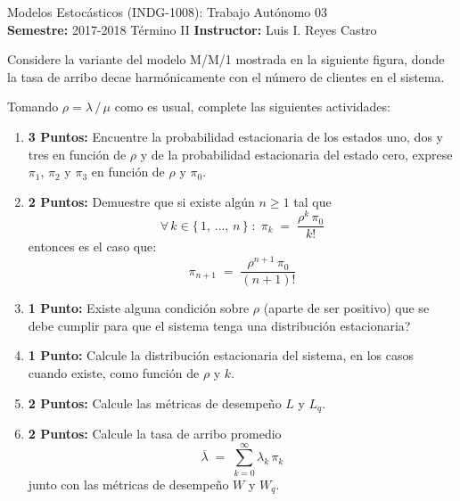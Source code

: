 \documentclass[ a4paper, twoside, 11pt]{article}
\newcommand{\numero}{03}
\begin{document}
\allowdisplaybreaks



\begin{center}
\Large Modelos Estoc\'asticos (INDG-1008): Trabajo Aut\'onomo \numero \\[1ex]
\small \textbf{Semestre:} 2017-2018 T\'ermino II \qquad
\textbf{Instructor:} Luis I. Reyes Castro
\end{center}
\fullskip

%
\halfskip

\begin{problem}
Considere la variante del modelo M/M/1 mostrada en la siguiente figura, donde la tasa de arribo decae harm\'onicamente con el n\'umero de clientes en el sistema. 

\begin{figure}[htb]
\centering
\def\svgwidth{0.9\columnwidth}

\end{figure}
\halfskip

Tomando $\rho = \lambda \, / \, \mu$ como es usual, complete las siguientes actividades: 
\begin{enumerate}[label=\textbf{\alph*)}]
\item \textbf{3 Puntos:} Encuentre la probabilidad estacionaria de los estados uno, dos y tres en funci\'on de $\rho$ y de la probabilidad estacionaria del estado cero, \ie exprese $\pi_1$, $\pi_2$ y $\pi_3$ en funci\'on de $\rho$ y $\pi_0$. 
\item \textbf{2 Puntos:} Demuestre que si existe alg\'un $n \geq 1$ tal que
\[
\forall \, k \in \{ \, 1, \, \dots, \, n \, \} \; \colon \;
\pi_k \; = \; \frac{ \rho^k \, \pi_0 }{k!}
\]
entonces es el caso que: 
\[
\pi_{n+1} \; = \; \frac{ \rho^{n+1} \, \pi_0 }{(n+1)!}
\]
\item \textbf{1 Punto:} Existe alguna condici\'on sobre $\rho$ (aparte de ser positivo) que se debe cumplir para que el sistema tenga una distribuci\'on estacionaria? 
\item \textbf{1 Punto:} Calcule la distribuci\'on estacionaria del sistema, en los casos cuando existe, como funci\'on de $\rho$ y $k$. 
\item \textbf{2 Puntos:} Calcule las m\'etricas de desempe\~no $L$ y $L_q$. 
\item \textbf{2 Puntos:} Calcule la tasa de arribo promedio
\[
\bar{\lambda} \; = \; \sum_{k=0}^{\infty} \lambda_{k} \, \pi_k
\]
junto con las m\'etricas de desempe\~no $W$ y $W_q$. 
\end{enumerate}

\end{problem}
\vspace{\baselineskip}
\end{document}
